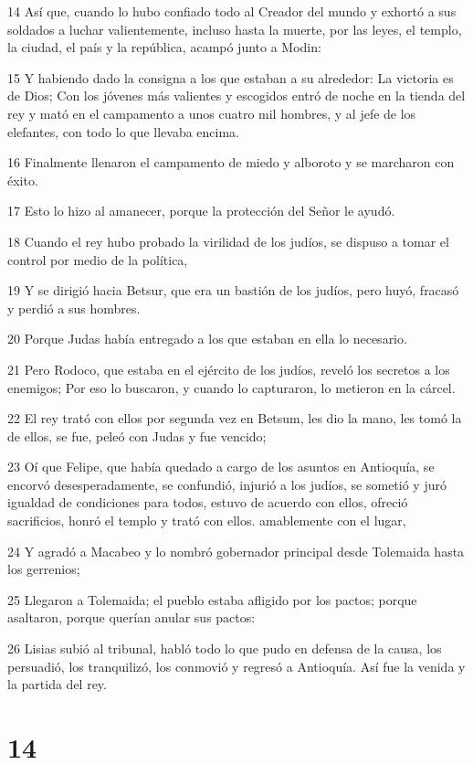 \par 14 Así que, cuando lo hubo confiado todo al Creador del mundo y exhortó a sus soldados a luchar valientemente, incluso hasta la muerte, por las leyes, el templo, la ciudad, el país y la república, acampó junto a Modin:
\par 15 Y habiendo dado la consigna a los que estaban a su alrededor: La victoria es de Dios; Con los jóvenes más valientes y escogidos entró de noche en la tienda del rey y mató en el campamento a unos cuatro mil hombres, y al jefe de los elefantes, con todo lo que llevaba encima.
\par 16 Finalmente llenaron el campamento de miedo y alboroto y se marcharon con éxito.
\par 17 Esto lo hizo al amanecer, porque la protección del Señor le ayudó.
\par 18 Cuando el rey hubo probado la virilidad de los judíos, se dispuso a tomar el control por medio de la política,
\par 19 Y se dirigió hacia Betsur, que era un bastión de los judíos, pero huyó, fracasó y perdió a sus hombres.
\par 20 Porque Judas había entregado a los que estaban en ella lo necesario.
\par 21 Pero Rodoco, que estaba en el ejército de los judíos, reveló los secretos a los enemigos; Por eso lo buscaron, y cuando lo capturaron, lo metieron en la cárcel.
\par 22 El rey trató con ellos por segunda vez en Betsum, les dio la mano, les tomó la de ellos, se fue, peleó con Judas y fue vencido;
\par 23 Oí que Felipe, que había quedado a cargo de los asuntos en Antioquía, se encorvó desesperadamente, se confundió, injurió a los judíos, se sometió y juró igualdad de condiciones para todos, estuvo de acuerdo con ellos, ofreció sacrificios, honró el templo y trató con ellos. amablemente con el lugar,
\par 24 Y agradó a Macabeo y lo nombró gobernador principal desde Tolemaida hasta los gerrenios;
\par 25 Llegaron a Tolemaida; el pueblo estaba afligido por los pactos; porque asaltaron, porque querían anular sus pactos:
\par 26 Lisias subió al tribunal, habló todo lo que pudo en defensa de la causa, los persuadió, los tranquilizó, los conmovió y regresó a Antioquía. Así fue la venida y la partida del rey.

\chapter{14}

